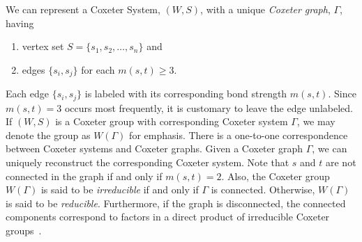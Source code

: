 We can represent a Coxeter System, $(W,S)$, with a unique \emph{Coxeter graph}, $\Gamma$, having
\begin{enumerate}
\item vertex set $S=\{s_1, s_2, \ldots, s_n\}$ and
\item edges $\{s_i, s_j\}$ for each $m(s,t) \geq 3$.	
\end{enumerate}
Each edge $\{s_i, s_j\}$ is labeled with its corresponding bond strength $m(s,t)$. Since $m(s,t)=3$ occurs most frequently, it is customary to leave the edge unlabeled. If $(W,S)$ is a Coxeter group with corresponding Coxeter system $\Gamma$, we may denote the group as $W(\Gamma)$ for emphasis. There is a one-to-one correspondence between Coxeter systems and Coxeter graphs. Given a Coxeter graph $\Gamma$, we can uniquely reconstruct the corresponding Coxeter system. Note that $s$ and $t$ are not connected in the graph if and only if $m(s,t)=2$. Also, the Coxeter group $W(\Gamma)$ is said to be \emph{irreducible} if and only if $\Gamma$ is connected. Otherwise, $W(\Gamma)$ is said to be \emph{reducible}. Furthermore, if the graph is disconnected, the connected components correspond to factors in a direct product of irreducible Coxeter groups~\cite{Humphreys1990}.\\

